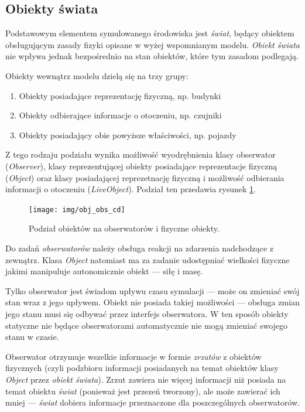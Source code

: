 {{\subsection{Obiekty świata}
\par{
Podstawowym elementem symulowanego środowiska jest \textit{świat}, będący obiektem obsługującym zasady fizyki opisane w wyżej wspomnianym modelu. \textit{Obiekt świata} nie wpływa jednak bezpośrednio na stan obiektów, które tym zasadom podlegają.
}
\par{
Obiekty wewnątrz modelu dzielą się na trzy grupy:
\begin{enumerate}
\item Obiekty posiadające reprezentację fizyczną, np. budynki
\item Obiekty odbierające informacje o otoczeniu, np. czujniki
\item Obiekty posiadający obie powyższe właściwości, np. pojazdy
\end{enumerate}
Z tego rodzaju podziału wynika możliwość wyodrębnienia klasy obserwator (\textit{Observer}), klasy reprezentującej obiekty posiadające reprezentacje fizyczną (\textit{Object}) oraz klasy posiadającej reprezetnację fizyczną i możliwość odbierania informacji o otoczeniu (\textit{LiveObject}). Podział ten przedawia rysunek \ref{obj_obs_cd}.
\begin{figure}[!ht]
    \begin{center}
	\texttt{[image: img/obj\_obs\_cd]}
	\caption{Podział obiektów na obserwatorów i fizyczne obiekty.}
	\label{obj_obs_cd}
    \end{center}
\end{figure}
}
\par{
Do zadań \textit{obserwatorów} należy obsługa reakcji na zdarzenia nadchodzące z zewnątrz. Klasa \textit{Object} natomiast ma za zadanie udostępniać wielkości fizyczne jakimi manipuluje autonomicznie obiekt --- siłę i masę.
}
\par{
Tylko obserwator jest świadom upływu czasu symulacji --- może on zmieniać swój stan wraz z jego upływem. Obiekt nie posiada takiej możliwości --- obsługa zmian jego stanu musi się odbywać przez interfejs obserwatora. W ten sposób obiekty statyczne nie będące obserwatorami automatycznie nie mogą zmieniać swojego stanu w czasie.
}
\par{
Obserwator otrzymuje wszelkie informacje w formie \textit{zrzutów} z obiektów fizycznych (czyli podzbioru informacji posiadanych na temat obiektów klasy \textit{Object} przez \textit{obiekt świata}). Zrzut zawiera nie więcej informacji niż posiada na temat obiektu \textit{świat} (ponieważ jest przezeń tworzony), ale może zawierać ich mniej --- \textit{świat} dobiera informacje przeznaczone dla poszczególnych obserwatorów.
}

}}
